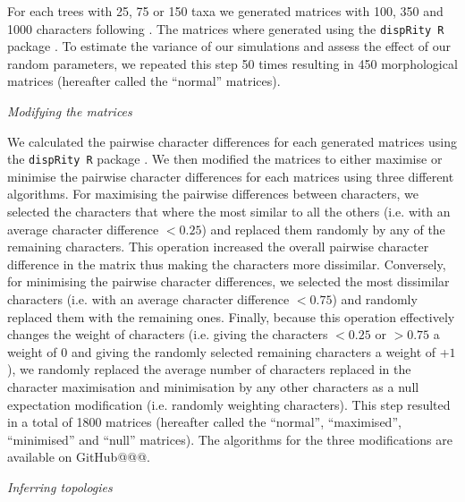 \documentclass[12pt,letterpaper]{article}
\renewcommand{\subsection}[1]{%
\bigskip
\begin{center}
\begin{large}
\normalfont\itshape #1
\end{large}
\end{center}}
\begin{document}
For each trees with 25, 75 or 150 taxa we generated matrices with 100, 350 and 1000 characters following \cite{OReilly20160081}.
The matrices where generated using the \texttt{dispRity R} package \citep[][; \url{https://github.com/TGuillerme/dispRity}]{thomas_guillerme_2016_55646}.
To estimate the variance of our simulations and assess the effect of our random parameters, we repeated this step 50 times resulting in 450 morphological matrices (hereafter called the ``normal'' matrices).

\subsection{Modifying the matrices}

We calculated the pairwise character differences for each generated matrices using the \texttt{dispRity R} package \citep{thomas_guillerme_2016_55646}. %
We then modified the matrices to either maximise or minimise the pairwise character differences for each matrices using three different algorithms.
For maximising the pairwise differences between characters, we selected the characters that where the most similar to all the others (i.e. with an average character difference $<$$0.25$) and replaced them randomly by any of the remaining characters.
This operation increased the overall pairwise character difference in the matrix thus making the characters more dissimilar.
Conversely, for minimising the pairwise character differences, we selected the most dissimilar characters (i.e. with an average character difference $<$$0.75$) and randomly replaced them with the remaining ones.
Finally, because this operation effectively changes the weight of characters (i.e. giving the characters $<$$0.25$ or $>$$0.75$ a weight of $0$ and giving the randomly selected remaining characters a weight of +$1$), we randomly replaced the average number of characters replaced in the character maximisation and minimisation by any other characters as a null expectation modification (i.e. randomly weighting characters).
This step resulted in a total of 1800 matrices (hereafter called the ``normal'', ``maximised'', ``minimised'' and ``null'' matrices).
The algorithms for the three modifications are available on GitHub@@@. %

\subsection{Inferring topologies}
\end{document}
